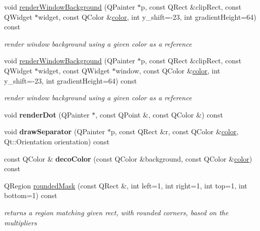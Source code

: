 \begin{DoxyCompactItemize}
\item 
\mbox{\label{class_style_helper_ad0ad4a8cbf72cd1c474bd9a88c4a2323}} 
void \hyperlink{class_style_helper_ad0ad4a8cbf72cd1c474bd9a88c4a2323}{render\+Window\+Background} (Q\+Painter $\ast$p, const Q\+Rect \&clip\+Rect, const Q\+Widget $\ast$widget, const Q\+Color \&\hyperlink{structcolor}{color}, int y\+\_\+shift=-\/23, int gradient\+Height=64) const
\begin{DoxyCompactList}\small\item\em render window background using a given color as a reference \end{DoxyCompactList}\item 
\mbox{\label{class_style_helper_aca64fc002b9b41312a3d81729e847591}} 
void \hyperlink{class_style_helper_aca64fc002b9b41312a3d81729e847591}{render\+Window\+Background} (Q\+Painter $\ast$p, const Q\+Rect \&clip\+Rect, const Q\+Widget $\ast$widget, const Q\+Widget $\ast$window, const Q\+Color \&\hyperlink{structcolor}{color}, int y\+\_\+shift=-\/23, int gradient\+Height=64) const
\begin{DoxyCompactList}\small\item\em render window background using a given color as a reference \end{DoxyCompactList}\item 
\mbox{\label{class_style_helper_a2a7942f513afa286158a941bcebe0648}} 
void {\bfseries render\+Dot} (Q\+Painter $\ast$, const Q\+Point \&, const Q\+Color \&) const
\item 
\mbox{\label{class_style_helper_a0f42d29ec146b6cd1e3ed6f780c40116}} 
void {\bfseries draw\+Separator} (Q\+Painter $\ast$p, const Q\+Rect \&r, const Q\+Color \&\hyperlink{structcolor}{color}, Qt\+::\+Orientation orientation) const
\item 
\mbox{\label{class_style_helper_aef75b6bb2cfd4ad9339a4a3934015645}} 
const Q\+Color \& {\bfseries deco\+Color} (const Q\+Color \&background, const Q\+Color \&\hyperlink{structcolor}{color}) const
\item 
Q\+Region \hyperlink{class_style_helper_a51cd489128487ccbf65126f87176d3f4}{rounded\+Mask} (const Q\+Rect \&, int left=1, int right=1, int top=1, int bottom=1) const
\begin{DoxyCompactList}\small\item\em returns a region matching given rect, with rounded corners, based on the multipliers \end{DoxyCompactList}\end{DoxyCompactItemize}
